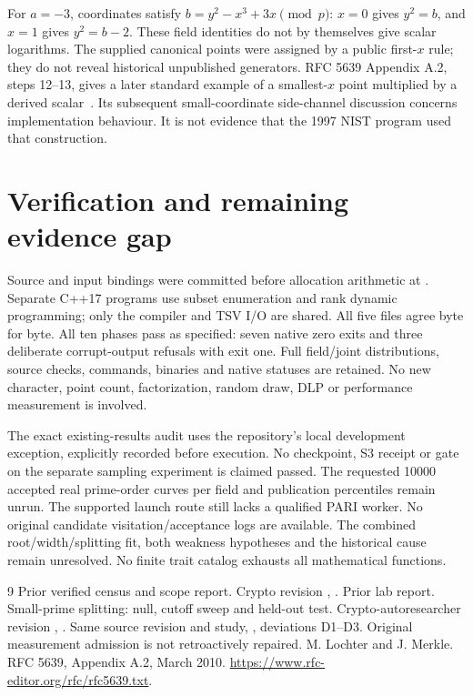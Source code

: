 \documentclass[10pt]{article}
\begin{document}
For $a=-3$, coordinates satisfy $b=y^2-x^3+3x\pmod p$: $x=0$ gives $y^2=b$,
and $x=1$ gives $y^2=b-2$. These field identities do not by themselves give
scalar logarithms. The supplied canonical points were assigned by a public
first-$x$ rule; they do not reveal historical unpublished generators.
RFC 5639 Appendix A.2, steps 12--13, gives a later standard example of a
smallest-$x$ point multiplied by a derived scalar~\cite{rfc}. Its subsequent
small-coordinate side-channel discussion concerns implementation behaviour.
It is not evidence that the 1997 NIST program used that construction.

\section{Verification and remaining evidence gap}
Source and input bindings were committed before allocation arithmetic at
. Separate C++17 programs use
subset enumeration and rank dynamic programming; only the compiler and TSV
I/O are shared. All five files agree byte for byte. All ten phases pass as
specified: seven native zero exits and three deliberate corrupt-output
refusals with exit one. Full field/joint distributions, source checks,
commands, binaries and native statuses are retained. No new character, point
count, factorization, random draw, DLP or performance measurement is involved.

The exact existing-results audit uses the repository's local development
exception, explicitly recorded before execution. No checkpoint, S3 receipt or
gate on the separate sampling experiment is claimed passed. The requested
10000 accepted real prime-order curves per field and publication percentiles
remain unrun. The supported launch route still lacks a qualified PARI worker.
No original candidate visitation/acceptance logs are available. The combined
root/width/splitting fit, both weakness hypotheses and the historical cause
remain unresolved. No finite trait catalog exhausts all mathematical functions.

\begin{thebibliography}{9}\small
{} Prior verified census and scope report. Crypto revision
,
.
 Prior lab report. Small-prime splitting: null, cutoff sweep
and held-out test. Crypto-autoresearcher revision
,
.
 Same source revision and study, ,
deviations D1--D3. Original measurement admission is not retroactively repaired.
 M. Lochter and J. Merkle. RFC 5639, Appendix A.2, March 2010.
\url{https://www.rfc-editor.org/rfc/rfc5639.txt}.
\end{thebibliography}
\end{document}
